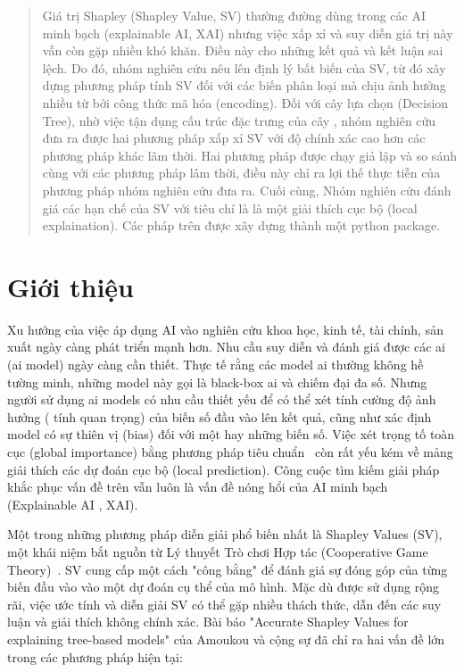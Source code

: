 \documentclass[12pt, a4paper]{article}
\begin{document}
\begin{abstract}
    Giá trị Shapley (Shapley Value, SV) thường đường dùng trong các AI minh bạch (explainable AI, XAI) nhưng việc xấp xỉ và suy diễn giá trị này vẫn còn gặp nhiều khó khăn. Điều này cho những kết quả và kết luận sai lệch. Do đó, nhóm nghiên cứu nêu lên định lý bất biến của SV, từ đó xây dựng phương pháp tính SV đối với các biến phân loại mà chịu ảnh hưởng nhiều từ bởi công thức mã hóa (encoding). Đối với cây lựa chọn (Decision Tree), nhờ việc tận dụng cấu trúc đặc trưng của cây , nhóm nghiên cứu đưa ra được hai phương pháp xấp xỉ SV với độ chính xác cao hơn các phương pháp khác lâm thời. Hai phương pháp được chạy giả lập và so sánh cùng với các phương pháp lâm thời, điều này chỉ ra lợi thế thực tiễn của phương pháp nhóm nghiên cứu đưa ra. Cuối cùng, Nhóm nghiên cứu đánh giá các hạn chế của SV với tiêu chí là là một giải thích cục bộ (local explaination). Các pháp trên được xây dựng thành một python package.
\end{abstract}

\section{Giới thiệu}

Xu hướng của việc áp dụng AI vào nghiên cứu khoa học, kinh tế, tài chính, sản xuất ngày càng phát triển mạnh hơn. Nhu cầu suy diễn và đánh giá được các ai (ai model) ngày càng cần thiết. Thực tế rằng các model ai thường không hề tường minh, những model này gọi là black-box ai và chiếm đại đa số. Nhưng người sử dụng ai models có nhu cầu thiết yếu để có thể xét tính cường độ ảnh hưởng ( tính quan trọng) của biến số đầu vào lên kết quả, cũng như xác định model có sự thiên vị (bias) đối với một hay những biến số. Việc xét trọng tố toàn cục (global importance) bằng phương pháp tiêu chuẩn~\citep{Breiman2001} còn rất yếu kém về mảng giải thích các dự đoán cục bộ (local prediction). Công cuộc tìm kiếm giải pháp khắc phục vấn đề trên vẫn luôn là vấn đề nóng hổi của AI minh bạch (Explainable AI , XAI).

Một trong những phương pháp diễn giải phổ biến nhất là Shapley Values (SV), một khái niệm bắt nguồn từ Lý thuyết Trò chơi Hợp tác (Cooperative Game Theory)~\citep{Shapley1953}. SV cung cấp một cách "công bằng" để đánh giá sự đóng góp của từng biến đầu vào vào một dự đoán cụ thể của mô hình. Mặc dù được sử dụng rộng rãi, việc ước tính và diễn giải SV có thể gặp nhiều thách thức, dẫn đến các suy luận và giải thích không chính xác. Bài báo "Accurate Shapley Values for explaining tree-based models" của Amoukou và cộng sự đã chỉ ra hai vấn đề lớn trong các phương pháp hiện tại:
\end{document}
